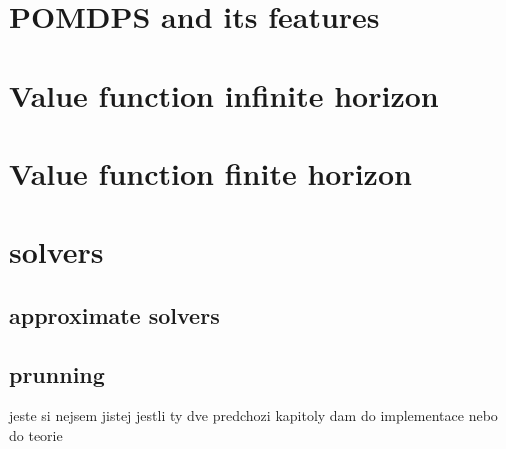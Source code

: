 \section{POMDPS and its features}

\section{Value function infinite horizon}

\section{Value function finite horizon}

\section{solvers}

\subsection{approximate solvers}

\subsection{prunning}
jeste si nejsem jistej jestli ty dve predchozi kapitoly dam do implementace nebo do teorie